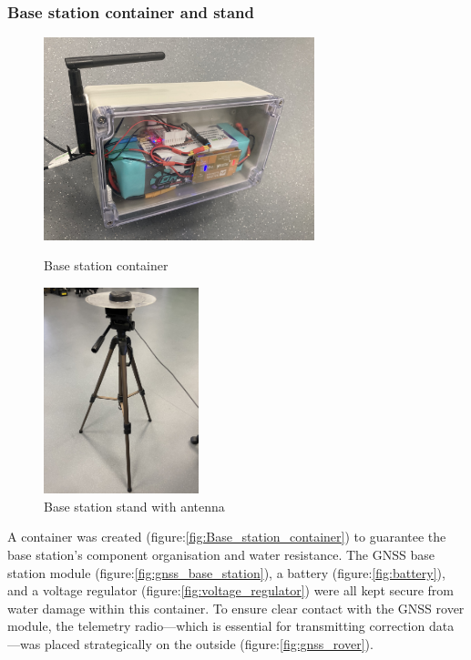 \documentclass{article}
\begin{document}
\subsubsection{Base station container and stand}
\begin{figure}[H]
  \begin{minipage}{.5\textwidth}
    \centering
    \includegraphics[width=0.7\textwidth]{Pictures/base_station_box.png}
    \caption{Base station container}
    \label{fig:Base_station_container}
  \end{minipage}
  \begin{minipage}{.5\textwidth}
    \centering
    \includegraphics[width=0.4\textwidth]{Pictures/base_station_stand.jpg}
    \caption{Base station stand with antenna}
    \label{fig:Base_station_stand}
  \end{minipage}
\end{figure}
A container was created (figure:\ref{fig:Base_station_container}) to guarantee the base station's component organisation and water resistance. The GNSS base station module (figure:\ref{fig:gnss_base_station}), a battery (figure:\ref{fig:battery}), and a voltage regulator (figure:\ref{fig:voltage_regulator}) were all kept secure from water damage within this container. To ensure clear contact with the GNSS 
rover module, the telemetry radio—which is essential for transmitting correction data—was placed strategically on the outside (figure:\ref{fig:gnss_rover}).
\end{document}

